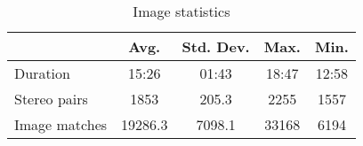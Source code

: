 \begin{table} 
    \label{tab:SurveyStats}
    \begin{tabular}{l c c c c} \toprule
     & Avg. & Std. Dev. & Max. & Min. \\ \midrule
    Duration & 15:26 & 01:43 & 18:47 & 12:58 \\
    Stereo pairs & 1853 & 205.3 & 2255 & 1557  \\ 
    Image matches & 19286.3 & 7098.1 & 33168 & 6194  \\ 
     \bottomrule
    \end{tabular} 
    \caption{Image statistics}
\end{table}
